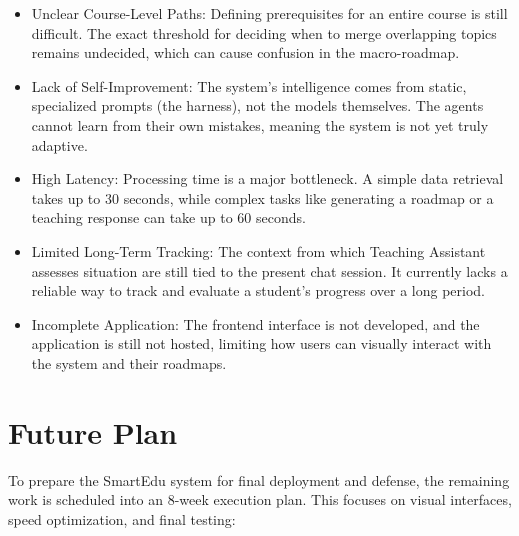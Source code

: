 \begin{itemize}
    \item {Unclear Course-Level Paths:} Defining prerequisites for an entire course is still difficult. The exact threshold for deciding when to merge overlapping topics remains undecided, which can cause confusion in the macro-roadmap.
    \item {Lack of Self-Improvement:} The system's intelligence comes from static, specialized prompts (the harness), not the models themselves. The agents cannot learn from their own mistakes, meaning the system is not yet truly adaptive.
    \item {High Latency:} Processing time is a major bottleneck. A simple data retrieval takes up to 30 seconds, while complex tasks like generating a roadmap or a teaching response can take up to 60 seconds.
    \item {Limited Long-Term Tracking:} The context from which Teaching Assistant assesses situation are still tied to the present chat session. 
    It currently lacks a reliable way to track and evaluate a student's progress over a long period.
    \item {Incomplete Application:} The frontend interface is not developed, and the application is still not hosted, limiting how users can visually interact 
    with the system and their roadmaps.
\end{itemize}

\section{Future Plan}
To prepare the SmartEdu system for final deployment and defense, the remaining work is scheduled into an 8-week execution plan. 
This focuses on visual interfaces, speed optimization, and final testing:

